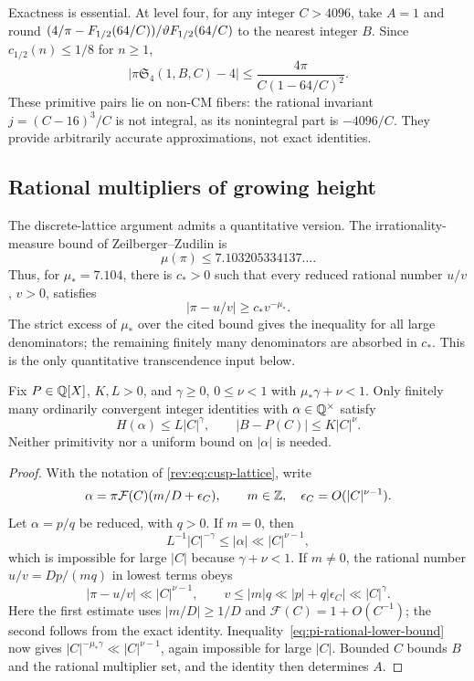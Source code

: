 Exactness is essential. At level four, for any integer $C>4096$, take
$A=1$ and round $(4/\pi-F_{1/2}(64/C))/\vartheta F_{1/2}(64/C)$
to the nearest integer $B$. Since $c_{1/2}(n)\le1/8$ for $n\ge1$,
\[
 \left|\pi\mathfrak S_4(1,B,C)-4\right|
 \le\frac{4\pi}{C(1-64/C)^2}.
\]
These primitive pairs lie on non-CM fibers: the rational invariant
$j=(C-16)^3/C$ is not integral, as its nonintegral part is $-4096/C$.
They provide arbitrarily accurate approximations, not exact identities.

\subsection{Rational multipliers of growing height}
\label{sec:growing-multiplier-height}

The discrete-lattice argument admits a quantitative version. The
irrationality-measure bound of Zeilberger--Zudilin
\cite[Part~II, conclusion]{ZZpi} is
\[
                         \mu(\pi)\le7.103205334137\ldots.
\]
Thus, for $\mu_*=7.104$, there is $c_*>0$ such that every reduced
rational number $u/v$, $v>0$, satisfies
\begin{equation}\label{eq:pi-rational-lower-bound}
                         |\pi-u/v|\ge c_*v^{-\mu_*}.
\end{equation}
The strict excess of $\mu_*$ over the cited bound gives the inequality
for all large denominators; the remaining finitely many denominators
are absorbed in $c_*$. This is the only quantitative transcendence
input below.

\begin{proposition}\label{prop:growing-rational-height}
Fix $P\in\mathbb Q[X]$, $K,L>0$, and $\gamma\ge0$, $0\le\nu<1$ with
$\mu_*\gamma+\nu<1$. Only finitely many ordinarily convergent integer
identities with $\alpha\in\mathbb Q^\times$ satisfy
\[
 H(\alpha)\le L|C|^\gamma,\qquad
 |B-P(C)|\le K|C|^\nu.
\]
Neither primitivity nor a uniform bound on $|\alpha|$ is needed.
\end{proposition}
\begin{proof}
With the notation of \eqref{rev:eq:cusp-lattice}, write
\[
 \alpha=\pi\mathcal F(C)(m/D+\epsilon_C),\qquad
 m\in\mathbb Z,\quad\epsilon_C=O(|C|^{\nu-1}).
\]
Let $\alpha=p/q$ be reduced, with $q>0$. If $m=0$, then
\[
 L^{-1}|C|^{-\gamma}\le|\alpha|\ll|C|^{\nu-1},
\]
which is impossible for large $|C|$ because $\gamma+\nu<1$.
If $m\ne0$, the rational number $u/v=Dp/(mq)$ in lowest terms obeys
\[
 |\pi-u/v|\ll|C|^{\nu-1},\qquad
 v\le |m|q\ll |p|+q|\epsilon_C|\ll|C|^\gamma.
\]
Here the first estimate uses $|m/D|\ge1/D$ and
$\mathcal F(C)=1+O(C^{-1})$; the second follows from the exact
identity. Inequality~\eqref{eq:pi-rational-lower-bound} now gives
$|C|^{-\mu_*\gamma}\ll|C|^{\nu-1}$, again impossible for large
$|C|$. Bounded $C$ bounds $B$ and the rational multiplier set, and the
identity then determines $A$.
\end{proof}

